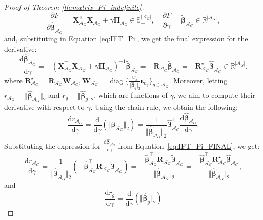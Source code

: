 \documentclass[10pt,a4paper]{amsart}
\newcommand{\Aset}{\mathcal{A}}
\newcommand{\T}{\top}
\def\bPi{\boldsymbol{\Pi}}
\def\bR{\mathbf{R}}
\def\bW{\mathbf{W}}
\def\bX{\mathbf{X}}
\def\bbeta{\boldsymbol{\beta}}
\DeclareMathOperator{\diag}{diag}
\begin{document}
\begin{proof}[Proof of Theorem \ref{th:matrix_Pi_indefinite}]
\begin{equation*}
\frac{\partial F}{\partial \widehat{\bbeta}_{\Aset_G}} = \bX_{\Aset_G}^{\T} \bX_{\Aset_G}+ \gamma \bPi_{\Aset_G}\in\mathbb{S}^{\vert\Aset_G\vert}_+,
\quad
\frac{\partial F}{\partial \gamma} =\widetilde{\bbeta}_{\Aset_G}\in\mathbb{R}^{\vert\Aset_G\vert},
\end{equation*}
and, substituting in Equation \eqref{eq:IFT_Pi}, we get the final expression for the derivative:
\begin{equation}
\label{eq:IFT_Pi_FINAL}
\frac{\mathrm{d}\widehat{\bbeta}_{\Aset_G}}{\mathrm{d}\gamma}
= -\left( \bX_{\Aset_G}^{\T} \bX_{\Aset_G} + \gamma \bPi_{\Aset_G} \right)^{-1}\widetilde{\bbeta}_{\Aset_G}=-\bR_{\Aset_G}\widetilde{\bbeta}_{\Aset_G}=-\bR_{\Aset_G}^\star\widehat{\bbeta}_{\Aset_G}\in\mathbb{R}^{\vert\Aset_G\vert}.
\end{equation}
where $\bR_{\Aset_G}^\star=\bR_{\Aset_G}\bW_{\Aset_G},\bW_{\Aset_G}=\diag\Big\{\frac{w_g}{\Vert\widehat{\bbeta}_{g}\Vert_2}\boldsymbol{\iota}_{n_g}\Big\}_{g\in\Aset_G}$. Moreover, letting $r_{\Aset_G} = \Vert \widehat{\bbeta}_{\Aset_G}\Vert_2$ and $r_g= \Vert \widehat{\bbeta}_{g}\Vert_2$, which are functions of $\gamma$, we aim to compute their derivative with respect to $\gamma$. Using the chain rule, we obtain the following:
\begin{equation*}
\frac{\mathrm{d}r_{\Aset_G}}{\mathrm{d}\gamma}
= \frac{\mathrm{d}}{\mathrm{d}\gamma} \left( \Vert \widehat{\bbeta}_{\Aset_G} \Vert_2 \right)
= \frac{1}{\Vert \widehat{\bbeta}_{\Aset_G} \Vert_2}\widehat{\bbeta}_{\Aset_G}^{\T} \frac{\mathrm{d}\widehat{\bbeta}_{\Aset_G}}{\mathrm{d}\gamma}.
\end{equation*}
Substituting the expression for \( \frac{\mathrm{d}\widehat{\bbeta}_{\Aset_G}}{\mathrm{d}\gamma} \) from Equation~\eqref{eq:IFT_Pi_FINAL}, we get:
\begin{equation*}
\frac{\mathrm{d}r_{\Aset_G}}{\mathrm{d}\gamma}
= \frac{1}{\Vert \widehat{\bbeta}_{\Aset_G} \Vert_2}
\left( -\widehat{\bbeta}_{\Aset_G}^{\T} \bR_{\Aset_G} \widetilde{\bbeta}_{\Aset_G} \right)=-\frac{ \widehat{\bbeta}_{\Aset_G}^{\T} \bR_{\Aset_G} \widetilde{\bbeta}_{\Aset_G} }{ \Vert \widehat{\bbeta}_{\Aset_G} \Vert_2}=-\frac{ \widehat{\bbeta}_{\Aset_G}^{\T} \bR_{\Aset_G}^\star \widehat{\bbeta}_{\Aset_G} }{\Vert \widehat{\bbeta}_{\Aset_G} \Vert_2},
\end{equation*}
and
\begin{equation}
\label{eq:dr_gdgamma}
\frac{\mathrm{d}r_g}{\mathrm{d}\gamma}
= \frac{\mathrm{d}}{\mathrm{d}\gamma} \left( \Vert \widehat{\bbeta}_{g} \Vert_2 \right)

\end{equation}
\end{proof}
\end{document}
